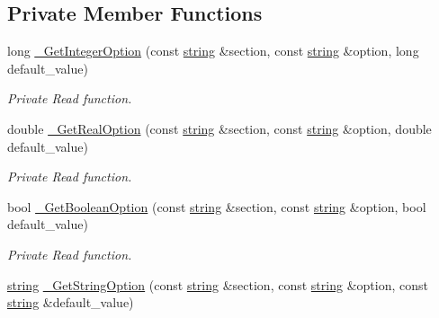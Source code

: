 \subsection*{Private Member Functions}
\begin{DoxyCompactItemize}
\item 
long \hyperlink{class_ensum_1_1_utils_1_1_options_a69b79cff0d5ad861b9f2be3bb296648f}{\+\_\+\+Get\+Integer\+Option} (const \hyperlink{class_ensum_1_1string}{string} \&section, const \hyperlink{class_ensum_1_1string}{string} \&option, long default\+\_\+value)\hypertarget{class_ensum_1_1_utils_1_1_options_a69b79cff0d5ad861b9f2be3bb296648f}{}\label{class_ensum_1_1_utils_1_1_options_a69b79cff0d5ad861b9f2be3bb296648f}

\begin{DoxyCompactList}\small\item\em Private Read function. \end{DoxyCompactList}\item 
double \hyperlink{class_ensum_1_1_utils_1_1_options_a3d79094def64e9e7bdbbe1c4532458e1}{\+\_\+\+Get\+Real\+Option} (const \hyperlink{class_ensum_1_1string}{string} \&section, const \hyperlink{class_ensum_1_1string}{string} \&option, double default\+\_\+value)\hypertarget{class_ensum_1_1_utils_1_1_options_a3d79094def64e9e7bdbbe1c4532458e1}{}\label{class_ensum_1_1_utils_1_1_options_a3d79094def64e9e7bdbbe1c4532458e1}

\begin{DoxyCompactList}\small\item\em Private Read function. \end{DoxyCompactList}\item 
bool \hyperlink{class_ensum_1_1_utils_1_1_options_a8c9a977bf971aa38af289af707a46490}{\+\_\+\+Get\+Boolean\+Option} (const \hyperlink{class_ensum_1_1string}{string} \&section, const \hyperlink{class_ensum_1_1string}{string} \&option, bool default\+\_\+value)\hypertarget{class_ensum_1_1_utils_1_1_options_a8c9a977bf971aa38af289af707a46490}{}\label{class_ensum_1_1_utils_1_1_options_a8c9a977bf971aa38af289af707a46490}

\begin{DoxyCompactList}\small\item\em Private Read function. \end{DoxyCompactList}\item 
\hyperlink{class_ensum_1_1string}{string} \hyperlink{class_ensum_1_1_utils_1_1_options_a741ecb0fda0375aa961d57108435c239}{\+\_\+\+Get\+String\+Option} (const \hyperlink{class_ensum_1_1string}{string} \&section, const \hyperlink{class_ensum_1_1string}{string} \&option, const \hyperlink{class_ensum_1_1string}{string} \&default\+\_\+value)\hypertarget{class_ensum_1_1_utils_1_1_options_a741ecb0fda0375aa961d57108435c239}{}\label{class_ensum_1_1_utils_1_1_options_a741ecb0fda0375aa961d57108435c239}


\end{DoxyCompactItemize}
